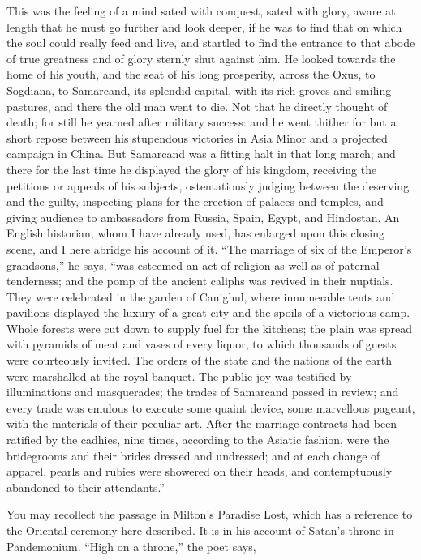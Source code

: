 This was the feeling of a mind
sated with conquest, sated with glory, aware at length that he must go
further and look deeper, if he was to find that on which the soul
could really feed and live, and startled to find the entrance to that
abode of true greatness and of glory sternly shut against him. He
looked towards the home of his youth, and the seat of his long
prosperity, across the Oxus, to Sogdiana, to Samarcand, its splendid
capital, with its rich groves and smiling pastures, and there the old
man went to die. Not that he directly thought of death; for still he
yearned after military success: and he went thither for but a short
repose between his stupendous victories in Asia Minor and a
projected campaign in China. But Samarcand was a fitting halt in that
long march; and there for the last time he displayed the glory of his
kingdom, receiving the petitions or appeals of his subjects,
ostentatiously judging between the deserving and the guilty,
inspecting plans for the erection of palaces and temples, and giving
audience to ambassadors from Russia, Spain, Egypt, and Hindostan. An
English historian, whom I have already used, has enlarged upon this
closing scene, and I here abridge his account of it. ``The marriage of
six of the Emperor's grandsons,'' he says, ``was esteemed an act of
religion as well as of paternal tenderness; and the pomp of the
ancient caliphs was revived in their nuptials. They were celebrated in
the garden of Canighul, where innumerable tents and pavilions
displayed the luxury of a great city and the spoils of a victorious
camp. Whole forests were cut down to supply fuel for the kitchens; the
plain was spread with pyramids of meat and vases of every liquor, to
which thousands of guests were courteously invited. The orders of the
state and the nations of the earth were marshalled at the royal
banquet. The public joy was testified by illuminations and
masquerades; the trades of Samarcand passed in review; and every trade
was emulous to execute some quaint device, some marvellous pageant,
with the materials of their peculiar art. After the marriage contracts
had been ratified by the cadhies, nine times, according to the Asiatic
fashion, were the bridegrooms and their brides dressed and undressed;
and at each change of apparel, pearls and rubies were showered on
their heads, and contemptuously abandoned to their attendants.''

You may recollect the passage
in Milton's Paradise Lost, which has a reference to the Oriental
ceremony here described. It is in his account of Satan's throne in
Pandemonium. ``High on a throne,'' the poet says,

